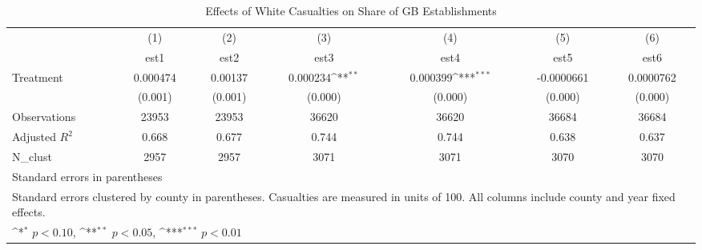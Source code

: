 \begin{table}[htbp]\centering
\def\sym#1{\ifmmode^{#1}\else\(^{#1}\)\fi}
\caption{Effects of White Casualties on Share of GB Establishments}
\begin{tabular}{l*{6}{c}}
\hline\hline
                    &\multicolumn{1}{c}{(1)}&\multicolumn{1}{c}{(2)}&\multicolumn{1}{c}{(3)}&\multicolumn{1}{c}{(4)}&\multicolumn{1}{c}{(5)}&\multicolumn{1}{c}{(6)}\\
                    &\multicolumn{1}{c}{est1}&\multicolumn{1}{c}{est2}&\multicolumn{1}{c}{est3}&\multicolumn{1}{c}{est4}&\multicolumn{1}{c}{est5}&\multicolumn{1}{c}{est6}\\
\hline
Treatment           &    0.000474         &     0.00137         &    0.000234\sym{**} &    0.000399\sym{***}&  -0.0000661         &   0.0000762         \\
                    &     (0.001)         &     (0.001)         &     (0.000)         &     (0.000)         &     (0.000)         &     (0.000)         \\
\hline
Observations        &       23953         &       23953         &       36620         &       36620         &       36684         &       36684         \\
Adjusted \(R^{2}\)  &       0.668         &       0.677         &       0.744         &       0.744         &       0.638         &       0.637         \\
N\_clust             &        2957         &        2957         &        3071         &        3071         &        3070         &        3070         \\
\hline\hline
\multicolumn{7}{l}{\footnotesize Standard errors in parentheses}\\
\multicolumn{7}{l}{\footnotesize Standard errors clustered by county in parentheses.         Casualties are measured in units of 100.          All columns include county and year fixed effects.}\\
\multicolumn{7}{l}{\footnotesize \sym{*} \(p<0.10\), \sym{**} \(p<0.05\), \sym{***} \(p<0.01\)}\\
\end{tabular}
\end{table}
